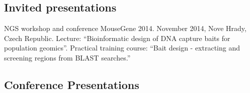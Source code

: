 \documentclass[10pt,a4paper]{article}
\renewenvironment{itemize}{
  \begin{list}{}{
    \setlength{\leftmargin}{2.5em}
    \setlength{\itemsep}{0.25em}
    \setlength{\parskip}{0pt}
    \setlength{\parsep}{0.25em}
  }
}{
  \end{list}
}
\begin{document}
%



\subsection*{Invited presentations}

\begin{itemize}

\item NGS workshop and conference MouseGene 2014. November 2014, Nove
  Hrady, Czech Republic. Lecture: ``Bioinformatic design of DNA
  capture baits for population geomics''. Practical training course:
  ``Bait design - extracting and screening regions from BLAST
  searches.''

\end{itemize}


\subsection*{Conference Presentations}
\end{document}
